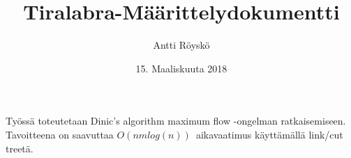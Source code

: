 \documentclass{article}
\title{Tiralabra-M\"a\"arittelydokumentti}
\author{Antti R\"oysk\"o}
\date{15. Maaliskuuta 2018}
\begin{document}
\maketitle

Työssä toteutetaan Dinic's algorithm maximum flow -ongelman ratkaisemiseen. Tavoitteena on saavuttaa $O(nm log(n))$ aikavaatimus käyttämällä link/cut treet\"a.
\end{document}
